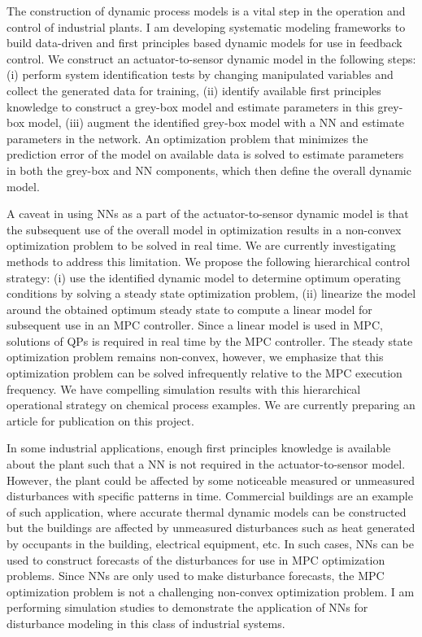 \documentclass[11pt, a4paper]{article} %
\begin{document}
The construction of dynamic process models is a vital step in the operation and 
control of industrial plants. I am developing systematic modeling frameworks to 
build data-driven and first principles based dynamic models for use in feedback 
control. We construct an actuator-to-sensor dynamic model in the following 
steps: (i) perform system identification tests by changing manipulated 
variables and collect the generated data for training, (ii) identify available 
first principles knowledge to construct a grey-box model and estimate 
parameters in this grey-box model, (iii) augment the identified grey-box model 
with a NN and estimate parameters in the network. An optimization problem that 
minimizes the prediction error of the model on available data is solved to 
estimate parameters in both the grey-box and NN components, which then define 
the overall dynamic model.

A caveat in using NNs as a part of the actuator-to-sensor dynamic model is that 
the subsequent use of the overall model in optimization results in a non-convex 
optimization problem to be solved in real time. We are currently investigating 
methods to address this limitation. We propose the following hierarchical 
control strategy: (i) use the identified dynamic model to determine optimum 
operating conditions by solving a steady state optimization problem, (ii) 
linearize the model around the obtained optimum steady state to compute a 
linear model for subsequent use in an MPC controller. Since a linear model is 
used in  MPC, solutions of QPs is required in real time by the MPC controller. 
The steady state optimization problem remains non-convex, however, we emphasize 
that this optimization problem can be solved infrequently relative to the MPC 
execution frequency. We have compelling simulation results with this 
hierarchical operational strategy on chemical process examples. We are 
currently preparing an article for publication on this project.

In some industrial applications, enough first principles knowledge is available 
about the plant such that a NN is not required in the actuator-to-sensor model. 
However, the plant could be affected by some noticeable measured or unmeasured 
disturbances with specific patterns in time. Commercial buildings are an 
example of such application, where accurate thermal dynamic models can be 
constructed but the buildings are affected by unmeasured disturbances such as 
heat generated by occupants in the building, electrical equipment, etc. In such 
cases, NNs can be used to construct forecasts of the disturbances for use in 
MPC optimization problems. Since NNs are only used to make disturbance 
forecasts, the MPC optimization problem is not a challenging non-convex 
optimization problem. I am performing simulation studies to demonstrate the 
application of NNs for disturbance modeling in this class of industrial systems.
\end{document}
